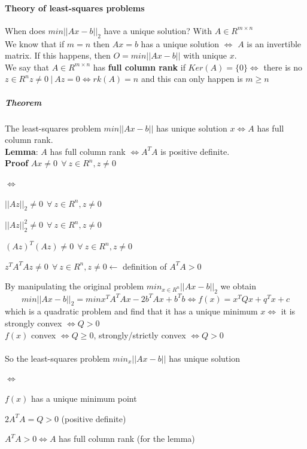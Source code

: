 \documentclass[10pt]{report}
\begin{document}
\paragraph{Theory of least-squares problems} When does $min ||Ax-b||_2$ have a unique solution? With $A \in R^{m\times n}$\\
We know that if $m=n$ then $Ax = b$ has a unique solution $\Leftrightarrow$ $A$ is an invertible matrix. If this happens, then $O = min||Ax-b||$ with unique $x$.\\
We say that $A\in R^{m\times n}$ has \textbf{full column rank} if $Ker(A) = \{0\} \Leftrightarrow$ there is no $z\in R^n z\neq 0\:|\:Az=0\Leftrightarrow rk(A) = n$ and this can only happen is $m\geq n$\\
\subparagraph{Theorem}The least-squares problem $min ||Ax-b||$ has unique solution $x\Leftrightarrow A$ has full column rank.\\
\textbf{Lemma}: $A$ has full column rank $\Leftrightarrow A^TA$ is positive definite.\\
\textbf{Proof} $Ax \neq 0\:\:\forall\:z\in R^n, z\neq 0$
\begin{list}{$\Leftrightarrow$}{}
	\item $||Az||_2 \neq 0\:\:\forall\:z\in R^n, z\neq 0$
	\item $||Az||_2^2 \neq 0\:\:\forall\:z\in R^n, z\neq 0$
	\item $(Az)^T(Az)\neq 0\:\:\forall\:z\in R^n, z\neq 0$
	\item $z^TA^TAz\neq 0\:\:\forall\:z\in R^n, z\neq 0 \longleftarrow$ definition of $A^TA > 0$
\end{list}
By manipulating the original problem $min_{x\in R^n} ||Ax-b||_2$ we obtain $$min ||Ax-b||_2 = min x^TA^TAx - 2b^TAx + b^Tb \Leftrightarrow f(x) = x^TQx + q^Tx + c$$ which is a quadratic problem and find that it has a unique minimum $x \Leftrightarrow$ it is strongly convex $\Leftrightarrow Q > 0$\\
$f(x)$ convex $\Leftrightarrow Q \geq 0$, strongly/strictly convex $\Leftrightarrow Q > 0$\\\\
So the least-squares problem $min_x ||Ax-b||$ has unique solution
\begin{list}{$\Leftrightarrow$}{}
	\item $f(x)$ has a unique minimum point
	\item $2A^TA = Q > 0$ (positive definite)
	\item $A^TA > 0 \Leftrightarrow A$ has full column rank (for the lemma)
\end{list}
\end{document}
